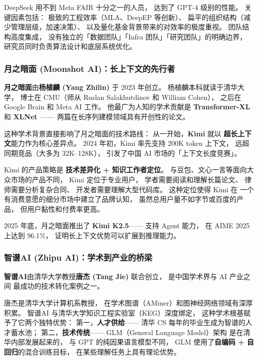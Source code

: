 DeepSeek 用不到 Meta FAIR 十分之一的人员，
达到了 GPT-4 级别的性能。
关键因素包括：
极致的工程效率（MLA、DeepEP 等创新）、
扁平的组织结构（减少管理层级，加速决策）、
以及量化基金背景带来的对效率的极度重视。
团队结构高度集成，
没有独立的「数据团队」「Infra 团队」「研究团队」的明确边界，
研究员同时负责算法设计和底层系统优化。

\subsubsection{月之暗面 (Moonshot AI)：长上下文的先行者}

\textbf{月之暗面}由\textbf{杨植麟 (Yang Zhilin)} 于 2023 年创立。
杨植麟本科就读于清华大学，
博士在 CMU（师从 Ruslan Salakhutdinov 和 William Cohen），
之后在 Google Brain 和 Meta AI 工作。
他最广为人知的学术贡献是
\textbf{Transformer-XL}~\cite{dai2019transformerxl}
和 \textbf{XLNet}~\cite{yang2019xlnet}——
两篇在长序列建模领域具有开创性的论文。

这种学术背景直接影响了月之暗面的技术路线：
从一开始，\textbf{Kimi} 就以
\textbf{超长上下文}能力作为核心差异点。
2024 年初，Kimi 率先支持 200K token 上下文，
远超同期竞品（大多为 32K--128K），
引发了中国 AI 市场的「上下文长度竞赛」。

Kimi 的产品策略是
\textbf{技术差异化 + 知识工作者定位}。
与豆包、文心一言等面向大众市场的产品不同，
Kimi 定位于专业用户，
学者需要阅读和理解长篇论文、
律师需要分析复杂合同、
开发者需要理解大型代码库。
这种定位使得 Kimi 在
一个有消费意愿的细分市场中建立了品牌认知，
虽然总用户量不如字节或百度的产品，
但用户黏性和付费率更高。

2025 年底，月之暗面推出了 \textbf{Kimi K2.5}——
支持 Agent 能力，
在 AIME 2025 上达到 96.1\%，
证明长上下文优势可以扩展到推理能力。

\subsubsection{智谱AI (Zhipu AI)：学术到产业的桥梁}

\textbf{智谱AI}由清华大学教授\textbf{唐杰 (Tang Jie)} 联合创立，
是中国学术界与 AI 产业之间
最成功的技术转化案例之一。

唐杰是清华大学计算机系教授，
在学术图谱（AMiner）和图神经网络领域有深厚积累。
智谱AI 与清华大学知识工程实验室（KEG）深度绑定，
这种学术根基赋予了它两个独特优势：
第一，\textbf{人才供给}——
清华 CS 每年的毕业生成为智谱的人才蓄水池；
第二，\textbf{技术传统}——
GLM（General Language Model）架构
是在清华内部发展起来的，
与 GPT 的纯因果语言模型不同，
GLM 使用了\textbf{自编码 + 自回归}的混合训练目标，
在某些理解任务上具有理论优势。

